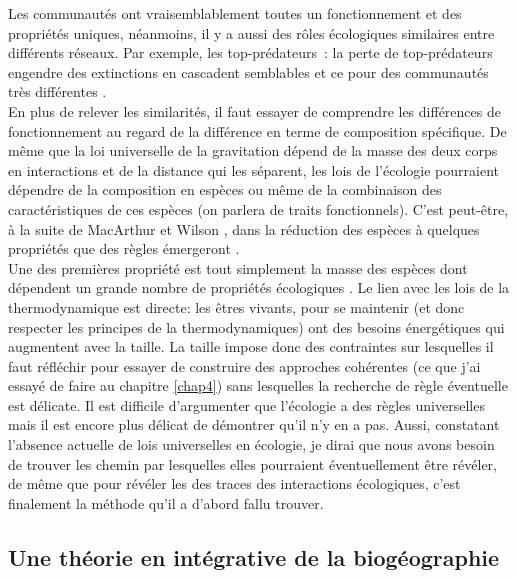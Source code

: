 Les communautés ont vraisemblablement toutes un fonctionnement et des
propriétés uniques, néanmoins, il y a aussi des rôles écologiques
similaires entre différents réseaux. Par exemple, les top-prédateurs~:
la perte de top-prédateurs engendre des extinctions en cascadent
semblables et ce pour des communautés très différentes
\citep{Terborgh2001, Sinclair2003a, Myers2007, Ripple2014}.\\
En plus de relever les similarités, il faut essayer de comprendre les
différences de fonctionnement au regard de la différence en terme de
composition spécifique. De même que la loi universelle de la gravitation
dépend de la masse des deux corps en interactions et de la distance qui
les séparent, les lois de l'écologie pourraient dépendre de la
composition en espèces ou même de la combinaison des caractéristiques de
ces espèces (on parlera de traits fonctionnels). C'est peut-être, à la
suite de MacArthur et Wilson \citep{MacArthur1967}, dans la réduction
des espèces à quelques propriétés que des règles émergeront
\citep{McGill2006, Poisot2015}.\\
Une des premières propriété est tout simplement la masse des espèces
dont dépendent un grande nombre de propriétés écologiques
\citep{Woodward2005a}. Le lien avec les lois de la thermodynamique est
directe: les êtres vivants, pour se maintenir (et donc respecter les
principes de la thermodynamiques) ont des besoins énergétiques qui
augmentent avec la taille. La taille impose donc des contraintes sur
lesquelles il faut réfléchir pour essayer de construire des approches
cohérentes (ce que j'ai essayé de faire au chapitre \ref{chap4}) sans
lesquelles la recherche de règle éventuelle est délicate. Il est
difficile d'argumenter que l'écologie a des règles universelles mais il
est encore plus délicat de démontrer qu'il n'y en a pas. Aussi,
constatant l'absence actuelle de lois universelles en écologie, je dirai
que nous avons besoin de trouver les chemin par lesquelles elles
pourraient éventuellement être révéler, de même que pour révéler les des
traces des interactions écologiques, c'est finalement la méthode qu'il a
d'abord fallu trouver.

\subsection*{Une théorie en intégrative de la
biogéographie}\label{une-thuxe9orie-en-intuxe9grative-de-la-bioguxe9ographie}

